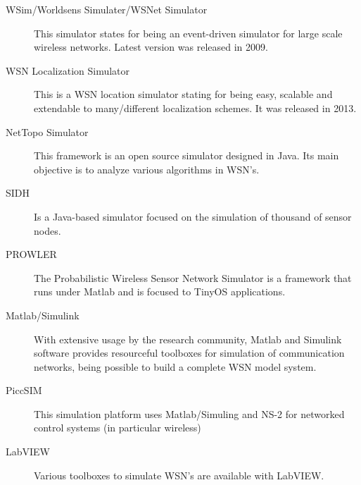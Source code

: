 \begin{description}
	\item [WSim/Worldsens Simulater/WSNet Simulator]
	This simulator states for being an event-driven simulator for large scale wireless networks. Latest version was released in 2009.

	\item [WSN Localization Simulator]
	This is a WSN location simulator stating for being easy, scalable and extendable to many/different localization schemes. It was released in 2013.
	
	\item [NetTopo Simulator]
	This framework is an open source simulator designed in Java. Its main objective is to analyze various algorithms in WSN's. 
	
	\item [SIDH]
	Is a Java-based simulator focused on the simulation of thousand of sensor nodes.
	
	\item [PROWLER]
	The Probabilistic Wireless Sensor Network Simulator is a framework that runs under Matlab and is focused to TinyOS applications.
	
	\item [Matlab/Simulink]
	With extensive usage by the research community, Matlab and Simulink software provides resourceful toolboxes for simulation of communication networks, being possible to build a complete WSN model system.
	
	\item [PiccSIM]
	This simulation platform uses Matlab/Simuling and NS-2 for networked control systems (in particular wireless)
	
	\item [LabVIEW]
	Various toolboxes to simulate WSN's are available with LabVIEW.
	
\end{description}






